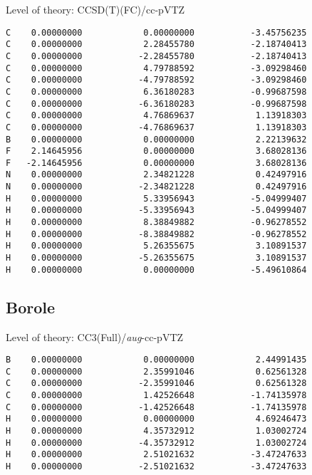 \documentclass[journal=jctcce,manuscript=article,layout=traditional]{achemso}
\newcommand{\TZ}{cc-pVTZ}
\newcommand{\AVTZ}{\emph{aug}-cc-pVTZ}
\begin{document}
\begin{singlespace}
Level of theory: CCSD(T)(FC)/{\TZ}
\begin{verbatim}
C    0.00000000            0.00000000           -3.45756235
C    0.00000000            2.28455780           -2.18740413
C    0.00000000           -2.28455780           -2.18740413
C    0.00000000            4.79788592           -3.09298460
C    0.00000000           -4.79788592           -3.09298460
C    0.00000000            6.36180283           -0.99687598
C    0.00000000           -6.36180283           -0.99687598
C    0.00000000            4.76869637            1.13918303
C    0.00000000           -4.76869637            1.13918303
B    0.00000000            0.00000000            2.22139632
F    2.14645956            0.00000000            3.68028136
F   -2.14645956            0.00000000            3.68028136
N    0.00000000            2.34821228            0.42497916
N    0.00000000           -2.34821228            0.42497916
H    0.00000000            5.33956943           -5.04999407
H    0.00000000           -5.33956943           -5.04999407
H    0.00000000            8.38849882           -0.96278552
H    0.00000000           -8.38849882           -0.96278552
H    0.00000000            5.26355675            3.10891537
H    0.00000000           -5.26355675            3.10891537
H    0.00000000            0.00000000           -5.49610864
\end{verbatim}
\end{singlespace}

\subsection*{Borole}

\begin{singlespace}
Level of theory: CC3(Full)/{\AVTZ}
\begin{verbatim}
B    0.00000000            0.00000000            2.44991435
C    0.00000000            2.35991046            0.62561328
C    0.00000000           -2.35991046            0.62561328
C    0.00000000            1.42526648           -1.74135978
C    0.00000000           -1.42526648           -1.74135978
H    0.00000000            0.00000000            4.69246473
H    0.00000000            4.35732912            1.03002724
H    0.00000000           -4.35732912            1.03002724
H    0.00000000            2.51021632           -3.47247633
H    0.00000000           -2.51021632           -3.47247633
\end{verbatim}
\end{singlespace}
\end{document}
